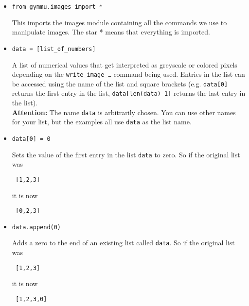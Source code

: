 \documentclass[11pt,a4paper]{report}
\begin{document}
 \begin{itemize}
\item \begin{lstlisting}
from gymmu.images import *
\end{lstlisting}

This imports the images \gls{module} containing all the commands we use to manipulate images. The star * means that everything is imported.


\item \begin{lstlisting}
data = [list_of_numbers]
\end{lstlisting}

A list of numerical values that get interpreted as greyscale or colored pixels depending on the \texttt{write\_image\_\ldots} command being used. Entries in the list can be accessed using the name of the list and square brackets (e.g. \texttt{data[0]} returns the first entry in the list, \texttt{data[len(data)-1]} returns the last entry in  the list).\\
{\bf Attention:} The name \texttt{data} is arbitrarily  chosen.  You can use other names for your list, but the examples all  use \texttt{data} as the list name.


\item \begin{lstlisting}
data[0] = 0
\end{lstlisting}

Sets the value of the first entry in the list \texttt{data} to zero. So if the original list was 

\begin{lstlisting}
 [1,2,3]
\end{lstlisting}
it is now
\begin{lstlisting}
 [0,2,3]
\end{lstlisting}

\item \begin{lstlisting}
data.append(0)
\end{lstlisting}

Adds a zero to the end of an existing list called \texttt{data}. So if the original list was

\begin{lstlisting}
 [1,2,3]
\end{lstlisting}
it is now
\begin{lstlisting}
 [1,2,3,0]
\end{lstlisting}







\end{itemize}
\end{document}
